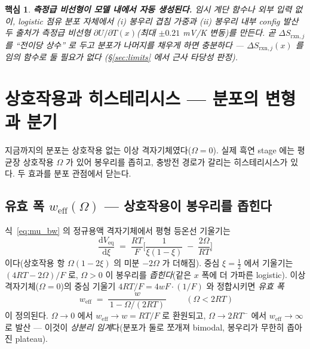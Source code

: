 \documentclass[11pt,a4paper]{article}
\newtheorem*{keybox}{핵심}
\newcommand{\dd}{\mathrm{d}}
\newcommand{\rxn}{\mathrm{rxn}}
\newcommand{\eq}{\mathrm{eq}}
\newcommand{\eff}{\mathrm{eff}}
\begin{document}
\begin{keybox}
\textbf{측정급 비선형이 모델 내에서 자동 생성된다.} 임시 계단 함수나 외부 입력 없이, logistic 점유
\emph{분포 자체}에서 (i) 봉우리 겹침 가중과 (ii) 봉우리 내부 config 발산 두 출처가 측정급 비선형
$\partial U/\partial T(x)$(최대 $\pm0.21$ mV/K 변동)를 만든다. 곧 $\Delta S_{\rxn,j}$ 를 ``전이당 상수''
로 두고 분포가 나머지를 채우게 하면 충분하다 — $\Delta S_{\rxn,j}(x)$ 를 임의 함수로 둘 필요가 없다
(\S\ref{sec:limits} 에서 근사 타당성 판정).
\end{keybox}

\section{상호작용과 히스테리시스 — 분포의 변형과 분기}\label{sec:omega}
지금까지의 분포는 상호작용 없는 이상 격자기체였다($\Omega=0$). 실제 흑연 stage 에는 평균장 상호작용
$\Omega$ 가 있어 봉우리를 좁히고, 충방전 경로가 갈리는 히스테리시스가 있다. 두 효과를 분포 관점에서
닫는다.

\subsection{유효 폭 $w_\eff(\Omega)$ — 상호작용이 봉우리를 좁힌다}
식~\eqref{eq:mu_bw} 의 정규용액 격자기체에서 평형 등온선 기울기는
\begin{equation}
\frac{\dd V_\eq}{\dd\xi}
   \;=\;\frac{RT}{F}\Big[\frac{1}{\xi(1-\xi)}\;-\;\frac{2\Omega}{RT}\Big]
\label{eq:isotherm_slope}
\end{equation}
이다(상호작용 항 $\Omega(1-2\xi)$ 의 미분 $-2\Omega$ 가 더해짐). 중심 $\xi=\tfrac12$ 에서 기울기는
$(4RT-2\Omega)/F$ 로, $\Omega>0$ 이 봉우리를 \emph{좁힌다}(같은 $x$ 폭에 더 가파른 logistic). 이상
격자기체($\Omega=0$)의 중심 기울기 $4RT/F=4w F\cdot\!(1/F)$ 와 정합시키면 \emph{유효 폭}
\begin{equation}
\boxed{\;w_\eff\;=\;\frac{w}{\,1-\Omega/(2RT)\,}\;}\qquad(\Omega<2RT)
\label{eq:weff}
\end{equation}
이 정의된다. $\Omega\to0$ 에서 $w_\eff\to w=RT/F$ 로 환원되고, $\Omega\to2RT^-$ 에서
$w_\eff\to\infty$ 로 발산 — 이것이 \emph{상분리 임계}다(분포가 둘로 쪼개져 bimodal, 봉우리가 무한히
좁아진 plateau).
\end{document}
